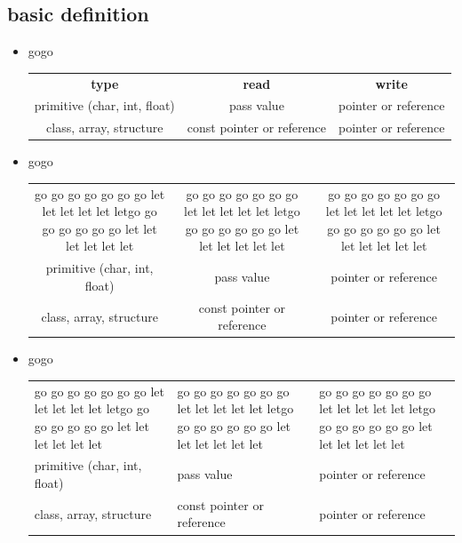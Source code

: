 \documentclass[a4paper,11pt,twoside]{book}
\newcommand{\tophline}{ }
\newcommand{\bottomhline}{ }
\begin{document}
\subsection{basic definition}
\begin{itemize}

\item gogo 
	
\begin{tabular}{|c|c|c|}

	\textbf{type} & \textbf{read} & \textbf{write} \\

	primitive (char, int, float) & pass value & pointer or reference \\

	class, array, structure  & const pointer or reference &  pointer or reference  
\end{tabular}
\item gogo \newline

\begin{tabular}{|c|c|c|}
	
	go go go go go go go let let let let let letgo go go go go go go let let let let let let &  go go go go go go go let let let let let letgo go go go go go go let let let let let let&
	go go go go go go go let let let let let letgo go go go go go go let let let let let let  \\
	
	primitive (char, int, float) & pass value & pointer or reference \\
	
	class, array, structure  & const pointer or reference &  pointer or reference  
\end{tabular}

\item gogo 

\begin{tabular}{|p{}|p{}|p{}|}
	\tophline
	go go go go go go go let let let let let letgo go go go go go go let let let let let let &  go go go go go go go let let let let let letgo go go go go go go let let let let let let&
	go go go go go go go let let let let let letgo go go go go go go let let let let let let  
	\\ \tophline
	
	primitive (char, int, float) & pass value & pointer or reference \\ \tophline
	class, array, structure  & const pointer or reference &  pointer or reference \bottomhline
\end{tabular}



\end{itemize}
\end{document}
